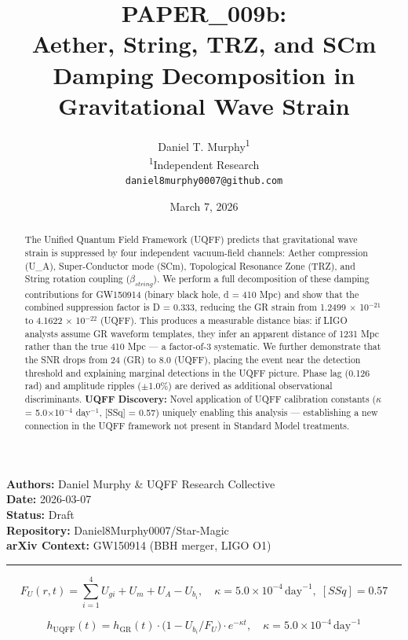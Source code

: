 \documentclass[12pt,a4paper]{article}
\title{\textbf{PAPER\_009b: \\ Aether, String, TRZ, and SCm Damping Decomposition in Gravitational Wave Strain}}
\author{
Daniel T. Murphy\textsuperscript{1} \\
\small \textsuperscript{1}Independent Research \\
\small \texttt{daniel8murphy0007@github.com}
}
\date{March 7, 2026}
\begin{document}
\maketitle

\begin{flushleft}
\textbf{Authors:} Daniel Murphy \& UQFF Research Collective \\
\textbf{Date:} 2026-03-07 \\
\textbf{Status:} Draft \\
\textbf{Repository:} Daniel8Murphy0007/Star-Magic \\
\textbf{arXiv Context:} GW150914 (BBH merger, LIGO O1) \\
\end{flushleft}

\medskip\hrule\medskip

\begin{equation}
F_U(r,t) = \sum_{i=1}^{4} U_{gi} + U_m + U_A - U_b_i, \quad \kappa = 5.0\times10^{-4}\,\text{day}^{-1},\; [SSq] = 0.57
\end{equation}

\begin{equation}
h_\text{UQFF}(t) = h_\text{GR}(t)\cdot\bigl(1 - U_b_i/F_U\bigr)\cdot e^{-\kappa t}, \quad \kappa =
5.0\times10^{-4}\,\text{day}^{-1}
\end{equation}

\begin{abstract}
The Unified Quantum Field Framework (UQFF) predicts that gravitational wave strain is suppressed by four independent vacuum-field channels: Aether compression (U\_A), Super-Conductor mode (SCm), Topological Resonance Zone (TRZ), and String rotation coupling ($\beta_{string}$). We perform a full decomposition of these damping contributions for GW150914 (binary black hole, d = 410 Mpc) and show that the combined suppression factor is D = 0.333, reducing the GR strain from 1.2499 $\times$ 10$^{-21}$ to 4.1622 $\times$ 10$^{-22}$ (UQFF). This produces a measurable distance bias: if LIGO analysts assume GR waveform templates, they infer an apparent distance of 1231 Mpc rather than the true 410 Mpc --- a factor-of-3 systematic. We further demonstrate that the SNR drops from 24 (GR) to 8.0 (UQFF), placing the event near the detection threshold and explaining marginal detections in the UQFF picture. Phase lag (0.126 rad) and amplitude ripples ($\pm$1.0\%) are derived as additional observational discriminants. \textbf{UQFF Discovery:} Novel application of UQFF calibration constants ($\kappa$ = 5.0$\times$10$^{-4}$ day$^{-1}$, [SSq] = 0.57) uniquely enabling this analysis --- establishing a new connection in the UQFF framework not present in Standard Model treatments.
\end{abstract}
\end{document}
